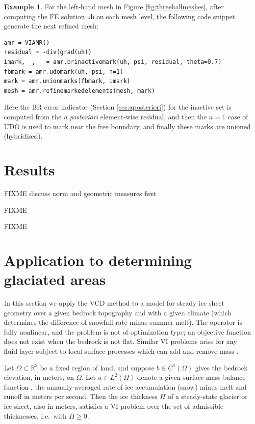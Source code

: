 \documentclass[]{interact}
\theoremstyle{plain}%
\theoremstyle{definition}
\newtheorem{example}[theorem]{Example}
\theoremstyle{remark}
\newcommand{\RR}{\mathbb{R}}
\begin{document}
\begin{example} \label{example:hybrid}
For the left-hand mesh in Figure \ref{fig:threeballmeshes}, after computing the FE solution \texttt{uh} on each mesh level, the following code snippet generate the next refined mesh:
\begin{verbatim}
amr = VIAMR()
residual = -div(grad(uh))
imark, _, _ = amr.brinactivemark(uh, psi, residual, theta=0.7)
fbmark = amr.udomark(uh, psi, n=1)
mark = amr.unionmarks(fbmark, imark)
mesh = amr.refinemarkedelements(mesh, mark)
\end{verbatim}
Here the BR error indicator (Section \ref{sec:aposteriori}) for the inactive set is computed from the \emph{a posteriori} element-wise residual, and then the $n=1$ case of UDO is used to mark near the free boundary, and finally these marks are unioned (hybridized).
\end{example}



\section{Results} \label{sec:results}

FIXME discuss norm and geometric measures first

FIXME \cite{Kosub2016} \cite{JungeblutKleistMiltzow2022}

FIXME


\section{Application to determining glaciated areas} \label{sec:app}

In this section we apply the VCD method to a model for steady ice sheet geometry over a given bedrock topography and with a given climate (which determines the difference of snowfall rate minus summer melt).  The operator is fully nonlinear, and the problem is not of optimization type; an objective function does not exist when the bedrock is not flat.  Similar VI problems arise for any fluid layer subject to local surface processes which can add and remove mass \cite{Bueler2021b}.

Let $\Omega \subset \RR^2$ be a fixed region of land, and suppose $b \in C^1(\Omega)$ gives the bedrock elevation, in meters, on $\Omega$.  Let $a \in L^2(\Omega)$ denote a given surface mass-balance function \cite{GreveBlatter2009}, the annually-averaged rate of ice accumulation (snow) minus melt and runoff in meters per second.  Then the ice thickness $H$ of a steady-state glacier or ice sheet, also in meters, satisfies a VI problem over the set of admissible thicknesses, i.e.~with $H\ge 0$.
\end{document}
